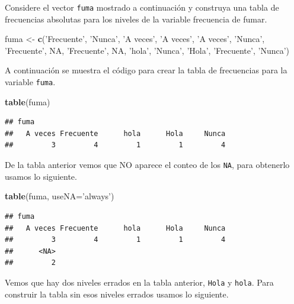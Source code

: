 \documentclass[10pt,]{krantz}
\makeatletter
\newenvironment{Shaded}{\begin{snugshade}}{\end{snugshade}}
\newcommand{\KeywordTok}[1]{\textcolor[rgb]{0.13,0.29,0.53}{\textbf{{#1}}}}
\newcommand{\DataTypeTok}[1]{\textcolor[rgb]{0.13,0.29,0.53}{{#1}}}
\newcommand{\StringTok}[1]{\textcolor[rgb]{0.31,0.60,0.02}{{#1}}}
\newcommand{\OtherTok}[1]{\textcolor[rgb]{0.56,0.35,0.01}{{#1}}}
\newcommand{\NormalTok}[1]{{#1}}
\newenvironment{kframe}{%
\medskip{}
\setlength{\fboxsep}{.8em}
 \def\at@end@of@kframe{}%
 \ifinner\ifhmode%
  \def\at@end@of@kframe{\end{minipage}}%
  \begin{minipage}{\columnwidth}%
 \fi\fi%
 \def\FrameCommand##1{\hskip\@totalleftmargin \hskip-\fboxsep
 \colorbox{shadecolor}{##1}\hskip-\fboxsep
     \hskip-\linewidth \hskip-\@totalleftmargin \hskip\columnwidth}%
 \MakeFramed {\advance\hsize-\width
   \@totalleftmargin\z@ \linewidth\hsize
   \@setminipage}}%
 {\par\unskip\endMakeFramed%
 \at@end@of@kframe}
\renewenvironment{Shaded}{\begin{kframe}}{\end{kframe}}
\makeatother
\begin{document}
Considere el vector \texttt{fuma} mostrado a continuación y construya
una tabla de frecuencias absolutas para los niveles de la variable
frecuencia de fumar.

\begin{Shaded}
\begin{Highlighting}[]
\NormalTok{fuma <-}\StringTok{ }\KeywordTok{c}\NormalTok{(}\StringTok{'Frecuente'}\NormalTok{, }\StringTok{'Nunca'}\NormalTok{, }\StringTok{'A veces'}\NormalTok{, }\StringTok{'A veces'}\NormalTok{, }\StringTok{'A veces'}\NormalTok{,}
          \StringTok{'Nunca'}\NormalTok{, }\StringTok{'Frecuente'}\NormalTok{, }\OtherTok{NA}\NormalTok{, }\StringTok{'Frecuente'}\NormalTok{, }\OtherTok{NA}\NormalTok{, }\StringTok{'hola'}\NormalTok{, }
          \StringTok{'Nunca'}\NormalTok{, }\StringTok{'Hola'}\NormalTok{, }\StringTok{'Frecuente'}\NormalTok{, }\StringTok{'Nunca'}\NormalTok{)}
\end{Highlighting}
\end{Shaded}

A continuación se muestra el código para crear la tabla de frecuencias
para la variable \texttt{fuma}.

\begin{Shaded}
\begin{Highlighting}[]
\KeywordTok{table}\NormalTok{(fuma)}
\end{Highlighting}
\end{Shaded}

\begin{verbatim}
## fuma
##   A veces Frecuente      hola      Hola     Nunca 
##         3         4         1         1         4
\end{verbatim}

De la tabla anterior vemos que NO aparece el conteo de los \texttt{NA},
para obtenerlo usamos lo siguiente.

\begin{Shaded}
\begin{Highlighting}[]
\KeywordTok{table}\NormalTok{(fuma, }\DataTypeTok{useNA=}\StringTok{'always'}\NormalTok{)}
\end{Highlighting}
\end{Shaded}

\begin{verbatim}
## fuma
##   A veces Frecuente      hola      Hola     Nunca 
##         3         4         1         1         4 
##      <NA> 
##         2
\end{verbatim}

Vemos que hay dos niveles errados en la tabla anterior, \texttt{Hola} y
\texttt{hola}. Para construir la tabla sin esos niveles errados usamos
lo siguiente.
\end{document}
